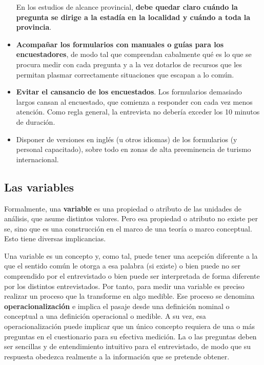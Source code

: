 \documentclass[
]{book}
\begin{document}
\begin{itemize}
  En los estudios de alcance provincial, \textbf{debe quedar claro cuándo la pregunta se dirige a la estadía en la localidad y cuándo a toda la provincia}.
\item
  \textbf{Acompañar los formularios con manuales o guías para los encuestadores}, de modo tal que comprendan cabalmente qué es lo que se procura medir con cada pregunta y a la vez dotarlos de recursos que les permitan plasmar correctamente situaciones que escapan a lo común.
\item
  \textbf{Evitar el cansancio de los encuestados}. Los formularios demasiado largos cansan al encuestado, que comienza a responder con cada vez menos atención. Como regla general, la entrevista no debería exceder los 10 minutos de duración.
\item
  Disponer de versiones en inglés (u otros idiomas) de los formularios (y personal capacitado), sobre todo en zonas de alta preeminencia de turismo internacional.
\end{itemize}

\hypertarget{las-variables}{%
\subsection{Las variables}\label{las-variables}}

Formalmente, una \textbf{variable} es una propiedad o atributo de las unidades de análisis, que asume distintos valores. Pero esa propiedad o atributo no existe per se, sino que es una construcción en el marco de una teoría o marco conceptual. Esto tiene diversas implicancias.

Una variable es un concepto y, como tal, puede tener una acepción diferente a la que el sentido común le otorga a esa palabra (si existe) o bien puede no ser comprendido por el entrevistado o bien puede ser interpretada de forma diferente por los distintos entrevistados. Por tanto, para medir una variable es preciso realizar un proceso que la transforme en algo medible. Ese proceso se denomina \textbf{operacionalización} e implica el pasaje desde una definición nominal o conceptual a una definición operacional o medible. A su vez, esa operacionalización puede implicar que un único concepto requiera de una o más preguntas en el cuestionario para su efectiva medición. La o las preguntas deben ser sencillas y de entendimiento intuitivo para el entrevistado, de modo que su respuesta obedezca realmente a la información que se pretende obtener.\\
\end{document}
